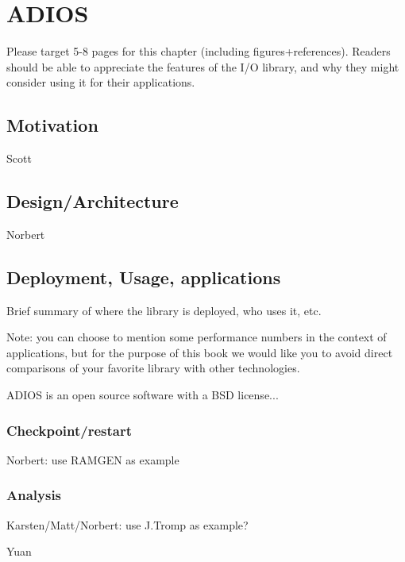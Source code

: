 
\chapter{ADIOS}
\label{part3-ch5-adios}
{\color {red}Please target 5-8 pages for this chapter (including figures+references). Readers should be able to appreciate the features of the I/O library, and why they might consider using it for their applications.}


\section{Motivation}
{\color {red}Scott}




\section{Design/Architecture}
{\color {red}Norbert}




\section{Deployment, Usage, applications}
{\color {red}Brief summary of where the library is deployed, who uses it, etc.

Note: you can choose to mention some performance numbers in the context of applications, but for the purpose of this book we would like you to avoid direct comparisons of your favorite library with other technologies.  }

ADIOS is an open source software with a BSD license...


\subsection{Checkpoint/restart}
{\color {red}Norbert: use RAMGEN as example}



\subsection{Analysis}
{\color {red}Karsten/Matt/Norbert: use J.Tromp as example?}

{\color {red}Yuan}



